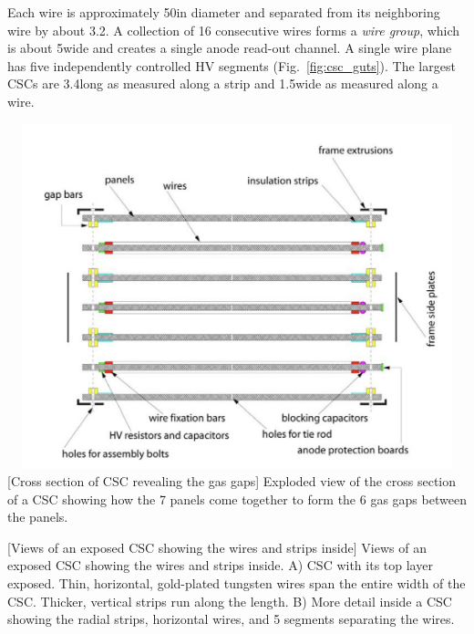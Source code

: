 Each wire is approximately 50\mum in diameter and separated from its neighboring wire by about 3.2\mm.
A collection of 16 consecutive wires forms a \emph{wire group}, which is about 5\cm wide and creates a single anode read-out channel.
A single wire plane has five independently controlled HV segments (Fig.~\ref{fig:csc_guts}).
The largest CSCs are 3.4\meter long as measured along a strip and 1.5\meter wide as measured along a wire.
\begin{multiFigure}
    \centering
    \includegraphics[width=15cm,height=10cm,keepaspectratio]{figures/cms/muonsys/csc_separatedlayers.jpeg}
        [Cross section of CSC revealing the gas gaps]
        {Exploded view of the cross section of a CSC showing how the 7 panels come together to form the 6 gas gaps between the panels.}
    \label{fig:csc_separatelayers}
\end{multiFigure}
\begin{multiFigure}
    \centering
        [Views of an exposed CSC showing the wires and strips inside]
        {Views of an exposed CSC showing the wires and strips inside.
        \;A) CSC with its top layer exposed.
        Thin, horizontal, gold-plated tungsten wires span the entire width of the CSC. 
        Thicker, vertical strips run along the length.
        \;B) More detail inside a CSC showing the radial strips, horizontal wires, and 5 segments separating the wires.
        }
    \label{fig:csc_guts}
\end{multiFigure}

